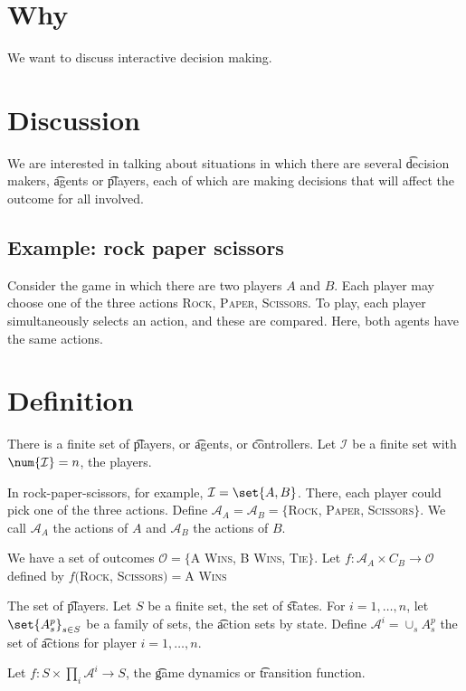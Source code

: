 

\section*{Why}

We want to discuss interactive decision making.

\section*{Discussion}

We are interested in talking about situations in which there are several \t{decision makers}, \t{agents} or \t{players}, each of which are making decisions that will affect the outcome for all involved.

\subsection*{Example: rock paper scissors}

Consider the game  in which there are two players $A$ and $B$.
Each player may choose one of the three actions \textsc{Rock}, \textsc{Paper}, \textsc{Scissors}.
To play, each player simultaneously selects an action, and these are compared.
Here, both agents have the same actions.

\section*{Definition}

There is a finite set of \t{players}, or \t{agents}, or \t{controllers}.
Let $\mathcal{I} $ be a finite set with $\num{\mathcal{I} } = n$, the players.

In rock-paper-scissors, for example, $\mathcal{I}  = \set{A, B}$.
There, each player could pick one of the three actions.
Define $\mathcal{A} _A = \mathcal{A} _B = \{$\textsc{Rock}, \textsc{Paper}, \textsc{Scissors}$\}$.
We call $\mathcal{A} _A$ the actions of $A$ and $\mathcal{A} _B$ the actions of $B$.

We have a set of outcomes $\mathcal{O} = \{$\textsc{A Wins}, \textsc{B Wins}, \textsc{Tie}$\}$.
Let $f: \mathcal{A} _A \times C_B \to \mathcal{O}$ defined by $f($\textsc{Rock}, \textsc{Scissors}$) = $\textsc{A Wins}

The set of \t{players}.
Let $S$ be a finite set, the set of \t{states}.
For $i = 1, \dots , n$, let $\set{A^p_s}_{s \in S}$ be a family of sets, the \t{action sets by state}.
Define $\mathcal{A} ^i = \cup_s A^p_s$ the set of \t{actions} for player $i = 1, \dots , n$.

Let $f: S \times  \prod_{i} \mathcal{A} ^i \to S$, the \t{game dynamics} or \t{transition function}.

\blankpage